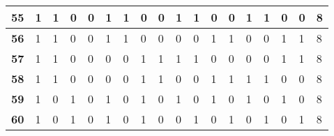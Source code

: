\begin{table}[h!]
{\begin{tabular}{|P{0.6cm}|P{0.65cm}|P{0.65cm}|P{0.65cm}|P{0.65cm}|P{0.65cm}|P{0.65cm}|P{0.65cm}|P{0.65cm}|P{0.65cm}|P{0.65cm}|P{0.65cm}|P{0.65cm}|P{0.65cm}|P{0.65cm}|P{0.65cm}|P{0.65cm}|P{2.9cm}|}
\textbf{55}                        & 1                     & 1                     & 0                     & 0                     & 1                     & 1                     & 0                     & 0                     & 1                     & 1                     & 0                     & 0                     & 1                     & 1                     & 0                     & 0                     & 8                     \\ \hline
\textbf{56}                        & 1                     & 1                     & 0                     & 0                     & 1                     & 1                     & 0                     & 0                     & 0                     & 0                     & 1                     & 1                     & 0                     & 0                     & 1                     & 1                     & 8                     \\ \hline
\textbf{57}                        & 1                     & 1                     & 0                     & 0                     & 0                     & 0                     & 1                     & 1                     & 1                     & 1                     & 0                     & 0                     & 0                     & 0                     & 1                     & 1                     & 8                     \\ \hline
\textbf{58}                        & 1                     & 1                     & 0                     & 0                     & 0                     & 0                     & 1                     & 1                     & 0                     & 0                     & 1                     & 1                     & 1                     & 1                     & 0                     & 0                     & 8                     \\ \hline
\textbf{59}                        & 1                     & 0                     & 1                     & 0                     & 1                     & 0                     & 1                     & 0                     & 1                     & 0                     & 1                     & 0                     & 1                     & 0                     & 1                     & 0                     & 8                     \\ \hline
\textbf{60}                        & 1                     & 0                     & 1                     & 0                     & 1                     & 0                     & 1                     & 0                     & 0                     & 1                     & 0                     & 1                     & 0                     & 1                     & 0                     & 1                     & 8                     \\ \hline

\end{tabular}}
\end{table}

